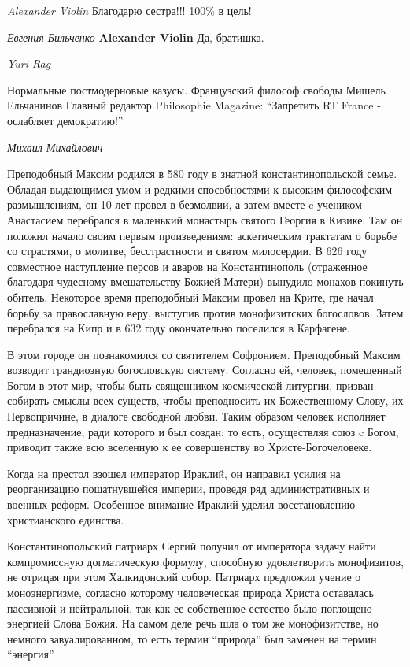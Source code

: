 \emph{Alexander Violin}
Благодарю сестра!!! 100\% в цель!

\emph{Евгения Бильченко}
\textbf{Alexander Violin} Да, братишка.

\emph{Yuri Rag}

Нормальные постмодерновые казусы. Французский философ свободы Мишель Ельчанинов
Главный редактор Philosophie Magazine: \enquote{Запретить RT France - ослабляет
демократию!}

\emph{Михаил Михайлович}

Преподобный Максим родился в 580 году в знатной константинопольской семье.
Обладая выдающимся умом и редкими способностями к высоким философским
размышлениям, он 10 лет провел в безмолвии, а затем вместе c учеником
Анастасием перебрался в маленький монастырь святого Георгия в Кизике. Там он
положил начало своим первым произведениям: аскетическим трактатам о борьбе со
страстями, о молитве, бесстрастности и святом милосердии. В 626 году совместное
наступление персов и аваров на Константинополь (отраженное благодаря чудесному
вмешательству Божией Матери) вынудило монахов покинуть обитель. Некоторое время
преподобный Максим провел на Крите, где начал борьбу за православную веру,
выступив против монофизитских богословов. Затем перебрался на Кипр и в 632 году
окончательно поселился в Карфагене.

В этом городе он познакомился со святителем Софронием. Преподобный Максим
возводит грандиозную богословскую систему. Согласно ей, человек, помещенный
Богом в этот мир, чтобы быть священником космической литургии, призван собирать
смыслы всех существ, чтобы преподносить их Божественному Слову, их
Первопричине, в диалоге свободной любви. Таким образом человек исполняет
предназначение, ради которого и был создан: то есть, осуществляя союз c Богом,
приводит также всю вселенную к ее совершенству во Христе-Богочеловеке.

Когда на престол взошел император Ираклий, он направил усилия на реорганизацию
пошатнувшейся империи, проведя ряд административных и военных реформ. Особенное
внимание Ираклий уделил восстановлению христианского единства.

Константинопольский патриарх Сергий получил от императора задачу найти
компромиссную догматическую формулу, способную удовлетворить монофизитов, не
отрицая при этом Халкидонский собор. Патриарх предложил учение о моноэнергизме,
согласно которому человеческая природа Христа оставалась пассивной и
нейтральной, так как ее собственное естество было поглощено энергией Слова
Божия. На самом деле речь шла о том же монофизитстве, но немного
завуалированном, то есть термин \enquote{природа} был заменен на термин \enquote{энергия}.

